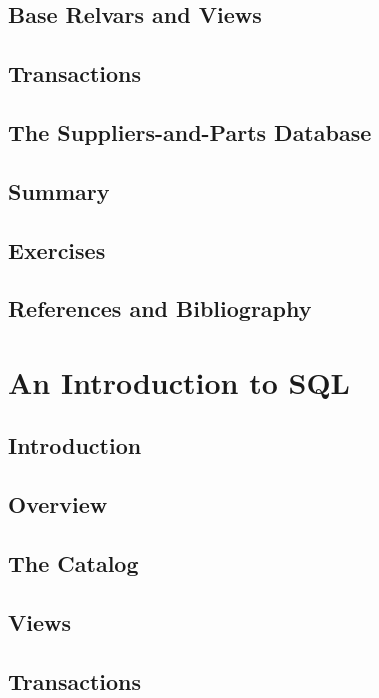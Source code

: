 \documentclass{book}
\begin{document}
\section{Base Relvars and Views}

\section{Transactions}

\section{The Suppliers-and-Parts Database}

\section{Summary}

\section{Exercises}

\section{References and Bibliography}





\chapter{An Introduction to SQL}


\section{Introduction}

\section{Overview}

\section{The Catalog}

\section{Views}

\section{Transactions}
\end{document}
